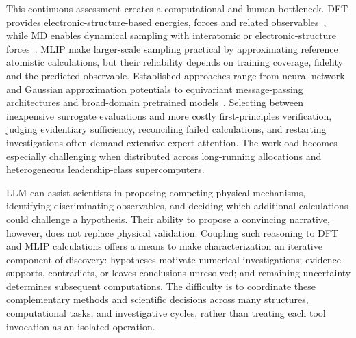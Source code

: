 \documentclass[11pt,a4paper]{article}
\def\ac#1{#1}%
\def\Acp#1{#1}%
\begin{document}
This continuous assessment creates a computational and human bottleneck. \Ac{DFT} provides electronic-structure-based energies, forces and related observables~\cite{hohenberg1964,kohn1965,kresse1996vasp,giannozzi2009qe}, while \ac{MD} enables dynamical sampling with interatomic or electronic-structure forces~\cite{verlet1967,car1985}. \Acp{MLIP} make larger-scale sampling practical by approximating reference atomistic calculations, but their reliability depends on training coverage, fidelity and the predicted observable. Established approaches range from neural-network and Gaussian approximation potentials to equivariant message-passing architectures and broad-domain pretrained models~\cite{behler2007,bartok2010,zhang2018deepmd,bartok2013soap,grisafi2018,musil2021,thomas2018tfn,geiger2022e3nn,schutt2018,batzner2022,batatia2022,chen2022m3gnet,deng2023,batatia2023macemp,wood2025uma}. Selecting between inexpensive surrogate evaluations and more costly first-principles verification, judging evidentiary sufficiency, reconciling failed calculations, and restarting investigations often demand extensive expert attention. The workload becomes especially challenging when distributed across long-running allocations and heterogeneous leadership-class supercomputers.

\Acp{LLM} can assist scientists in proposing competing physical mechanisms, identifying discriminating observables, and deciding which additional calculations could challenge a hypothesis. Their ability to propose a convincing narrative, however, does not replace physical validation. Coupling such reasoning to \ac{DFT} and \ac{MLIP} calculations offers a means to make characterization an iterative component of discovery: hypotheses motivate numerical investigations; evidence supports, contradicts, or leaves conclusions unresolved; and remaining uncertainty determines subsequent computations. The difficulty is to coordinate these complementary methods and scientific decisions across many structures, computational tasks, and investigative cycles, rather than treating each tool invocation as an isolated operation.
\end{document}
